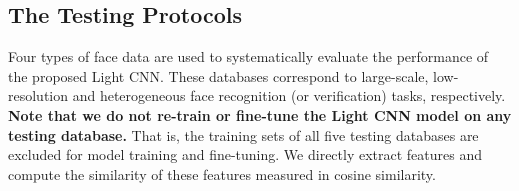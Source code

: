 \documentclass[journal,transmag]{IEEEtran}
\begin{document}


\subsection{The Testing Protocols}\label{protocols}

 Four types of face data are used to systematically evaluate the performance of the proposed Light CNN. These databases correspond to large-scale, low-resolution and heterogeneous face recognition (or verification) tasks, respectively. \textbf{Note that we do not re-train or fine-tune the Light CNN model on any testing database.} That is, the training sets of all five testing databases are excluded for model training and fine-tuning.
We directly extract features and compute the similarity of these features measured in cosine similarity.
\end{document}
